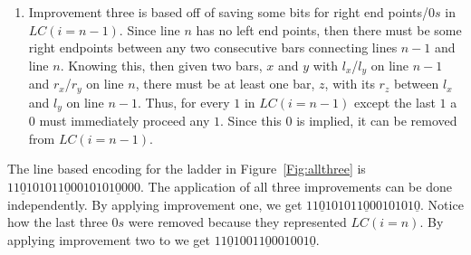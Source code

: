 \begin{enumerate}
\item Improvement three is based off of saving some bits for right 
end points/$0s$ in $LC(i=n-1)$. Since line $n$ has no left end points,
then there must be some right endpoints between any two 
consecutive bars connecting lines $n-1$ and line $n$. Knowing this, then 
given two bars, $x$ and $y$ with $l_{x}$/$l_{y}$ on line 
$n-1$ and $r_{x}$/$r_{y}$ on line $n$, there must be at least 
one bar, $z$, with its $r_{z}$ between $l_{x}$ and $l_{y}$
on line $n-1$. Thus, for every $1$ in $LC(i=n-1)$ except the 
last $1$ a $0$ must immediately proceed any $1$. 
Since this $0$ is implied, it can be removed from $LC(i=n-1)$.
\end{enumerate} 
The line based encoding for the ladder in Figure~\ref{Fig:allthree} is $11\underline{0}101011\underline{0}0010101\underline{0}000$. 
The application of all three improvements can be done independently.\newline 
By applying improvement one, we get $11\underline{0}101011\underline{0}0010101\underline{0}$. Notice how the last three $0s$ were removed because they represented $LC(i=n)$.
By applying improvement two to we get $11\underline{0}10011\underline{0}001001\underline{0}$.
